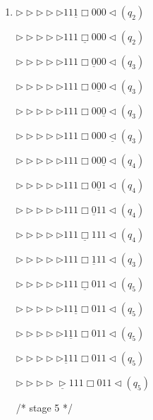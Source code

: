 \documentclass[12pt,a4paper]{article}
\makeatletter
\newtheorem*{solution}{Solution}
\theoremstyle{definition}
\renewenvironment{solution}[1][Solution] {\par\pushQED{\qed}\normalfont\topsep6\p@\@plus6\p@\relax\trivlist\item[\hskip\labelsep\bfseries#1\@addpunct{.}]\ignorespaces}{\popQED\endtrivlist\@endpefalse} \makeatother
\makeatother
\begin{document}
\begin{enumerate}
\begin{solution}
\begin{minipage}{0.3\textwidth}
		$\triangleright\triangleright\triangleright\triangleright\triangleright11\underline{1}\Box000\triangleleft(q_2)$
		
		$\triangleright\triangleright\triangleright\triangleright\triangleright111\underline{\Box}000\triangleleft(q_2)$
		
		$\triangleright\triangleright\triangleright\triangleright\triangleright111\Box\underline{0}00\triangleleft(q_3)$
		
		$\triangleright\triangleright\triangleright\triangleright\triangleright111\Box0\underline{0}0\triangleleft(q_3)$
		
		$\triangleright\triangleright\triangleright\triangleright\triangleright111\Box00\underline{0}\triangleleft(q_3)$
		
		$\triangleright\triangleright\triangleright\triangleright\triangleright111\Box000\underline{\triangleleft}(q_3)$
		
		$\triangleright\triangleright\triangleright\triangleright\triangleright111\Box00\underline{0}\triangleleft(q_4)$
		
		$\triangleright\triangleright\triangleright\triangleright\triangleright111\Box0\underline{0}1\triangleleft(q_4)$
		
		$\triangleright\triangleright\triangleright\triangleright\triangleright111\Box\underline{0}11\triangleleft(q_4)$
		
		$\triangleright\triangleright\triangleright\triangleright\triangleright111\underline{\Box}111\triangleleft(q_4)$
		
		$\triangleright\triangleright\triangleright\triangleright\triangleright111\Box\underline{1}11\triangleleft(q_3)$
		
		$\triangleright\triangleright\triangleright\triangleright\triangleright111\underline{\Box}011\triangleleft(q_5)$
		
		$\triangleright\triangleright\triangleright\triangleright\triangleright11\underline{1}\Box011\triangleleft(q_5)$
		
		$\triangleright\triangleright\triangleright\triangleright\triangleright1\underline{1}1\Box011\triangleleft(q_5)$
		
		$\triangleright\triangleright\triangleright\triangleright\triangleright\underline{1}11\Box011\triangleleft(q_5)$
		
		$\triangleright\triangleright\triangleright\triangleright\underline{\triangleright}111\Box011\triangleleft(q_5)$
		
		\quad
		
		/* stage 5 */
		

\end{minipage}
\end{solution}
\end{enumerate}
\end{document}
